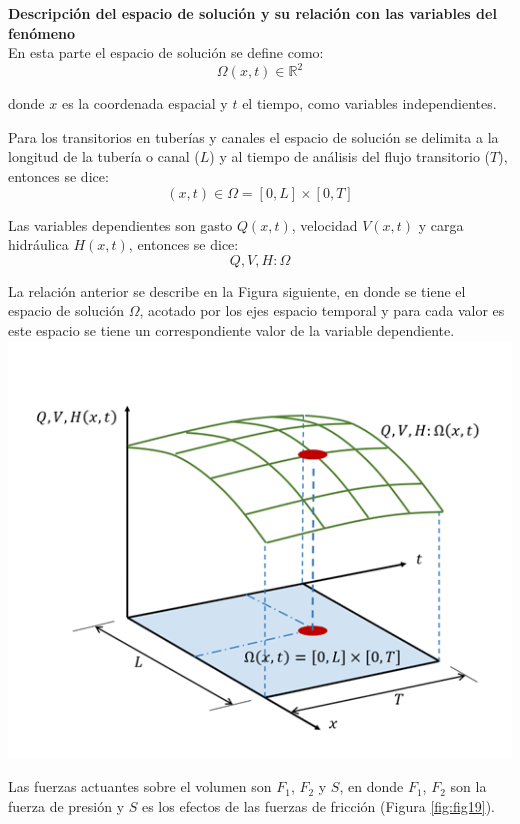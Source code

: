 \documentclass[letterpaper]{report}
\begin{document}
\begin{mdframed}[backgroundcolor=verdeclaro]
\textbf{Descripción del espacio de solución y su relación con las variables del fenómeno}\\
En esta parte el espacio de solución se define como:
\begin{equation*}
	\Omega(x,t) \in \mathbb{R}^2
\end{equation*}

donde $x$ es la coordenada espacial y $t$ el tiempo, como variables independientes.\bigskip

Para los transitorios en tuberías y canales el espacio de solución se delimita a la longitud de la tubería o canal ($L$) y al tiempo de análisis del flujo transitorio ($T$), entonces se dice:
\begin{equation*}
(x,t) \in \Omega =[0,L]\times[0,T]
\end{equation*}

Las variables dependientes son gasto $Q(x,t)$, velocidad $V(x,t)$ y carga hidráulica $H(x,t)$, entonces se dice:
\begin{equation*}
Q,V,H:\Omega
\end{equation*}

La relación anterior se describe en la Figura siguiente, en donde se tiene el espacio de solución $\Omega$, acotado por los ejes espacio temporal y para cada valor es este espacio se tiene 
un correspondiente valor de la variable dependiente.
\centering
\includegraphics[width=0.7\linewidth]{f04}
\end{mdframed}

Las fuerzas actuantes sobre el volumen son $F_1$, $F_2$ y $S$, en donde $F_1$, $F_2$ son la fuerza de presión y $S$ es los efectos de las fuerzas de fricción (Figura \ref{fig:fig19}).\bigskip
\end{document}
